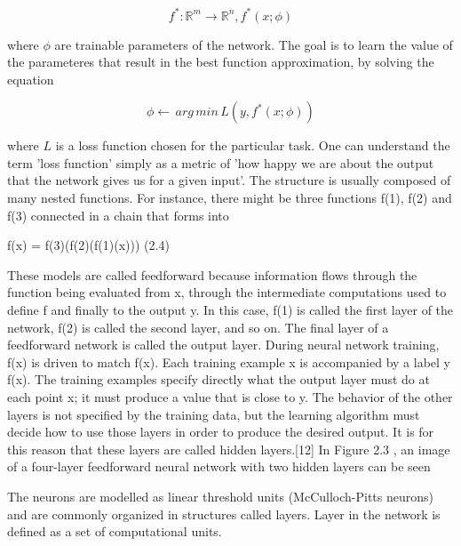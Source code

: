 $$ f^*: \mathbb{R}^m \rightarrow \mathbb{R}^n, f^*(x;\phi) $$

where $ \phi $ are trainable parameters of the network. The goal is to learn the value of the parameteres that result in the best function approximation, by solving the equation

$$ \phi \leftarrow \, arg \, min \, L(y, f^*(x;\phi)) $$

where $ L $ is a loss function chosen for the particular task. One can understand the term 'loss function' simply as a metric of 'how happy we are about the output that the network gives us for a given input'. The structure is usually composed of many nested functions. For instance, there might be three functions f(1), f(2) and f(3) connected in a chain that forms into

f(x) = f(3)(f(2)(f(1)(x))) (2.4)

These models are called feedforward because information flows through the function being evaluated from x, through the intermediate computations used to define f and finally to the output y. In this case, f(1) is called the first layer of the network, f(2) is called the second layer, and so on. The final layer of a feedforward network is called the output layer. During neural network training, f(x) is driven to match f(x). Each training example x is accompanied by a label y  f(x). The training examples specify
directly what the output layer must do at each point x; it must produce a value that is close to y. The behavior of the other layers is not specified by the training data, but the learning algorithm must decide how to use those layers in order to produce
the desired output. It is for this reason that these layers are called hidden layers.[12] In Figure 2.3 , an image of a four-layer feedforward neural network with two hidden layers can be seen

The neurons are modelled as linear threshold units (McCulloch-Pitts neurons) and are commonly organized in structures called layers. Layer in the network is defined as a set of computational units. 



        
